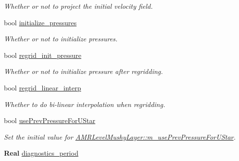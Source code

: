 \begin{DoxyCompactItemize}
\begin{DoxyCompactList}\small\item\em Whether or not to project the initial velocity field. \end{DoxyCompactList}\item 
\mbox{\label{struct_mushy_layer_options_affa5c5d02f32371c382b4a3aa528dc29}} 
bool \hyperlink{struct_mushy_layer_options_affa5c5d02f32371c382b4a3aa528dc29}{initialize\+\_\+pressures}
\begin{DoxyCompactList}\small\item\em Whether or not to initialize pressures. \end{DoxyCompactList}\item 
\mbox{\label{struct_mushy_layer_options_a0215ad26e1d2ca7797101f50ba932c63}} 
bool \hyperlink{struct_mushy_layer_options_a0215ad26e1d2ca7797101f50ba932c63}{regrid\+\_\+init\+\_\+pressure}
\begin{DoxyCompactList}\small\item\em Whether or not to initialize pressure after regridding. \end{DoxyCompactList}\item 
\mbox{\label{struct_mushy_layer_options_a1d8799620a4449e1d72c464eded2d4fb}} 
bool \hyperlink{struct_mushy_layer_options_a1d8799620a4449e1d72c464eded2d4fb}{regrid\+\_\+linear\+\_\+interp}
\begin{DoxyCompactList}\small\item\em Whether to do bi-\/linear interpolation when regridding. \end{DoxyCompactList}\item 
bool \hyperlink{struct_mushy_layer_options_ac2ad0fd5e02c9c4bd42ac2f4f04d15df}{use\+Prev\+Pressure\+For\+U\+Star}
\begin{DoxyCompactList}\small\item\em Set the initial value for \hyperlink{class_a_m_r_level_mushy_layer_af6dd293bd80f201846fc7d6fe6f851b1}{A\+M\+R\+Level\+Mushy\+Layer\+::m\+\_\+use\+Prev\+Pressure\+For\+U\+Star}. \end{DoxyCompactList}\item 
\mbox{\label{struct_mushy_layer_options_a9cd6c0292c7ad464b3e8dce21e74b653}} 
\textbf{ Real} \hyperlink{struct_mushy_layer_options_a9cd6c0292c7ad464b3e8dce21e74b653}{diagnostics\+\_\+period}

\end{DoxyCompactItemize}

